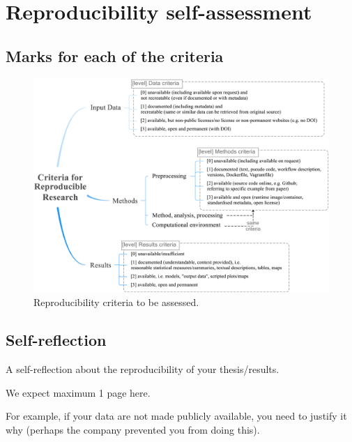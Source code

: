 

\chapter{Reproducibility self-assessment}

\section{Marks for each of the criteria}

\begin{figure}[h]
  \centering
  \includegraphics[width=0.65\linewidth]{figs/reproducibility_criteria.png}
  \caption{Reproducibility criteria to be assessed.}
\label{fig:reproducibility_criteria}
\end{figure}


\section{Self-reflection} 

A self-reflection about the reproducibility of your thesis/results.

We expect maximum 1 page here.

For example, if your data are not made publicly available, you need to justify it why (perhaps the company prevented you from doing this).